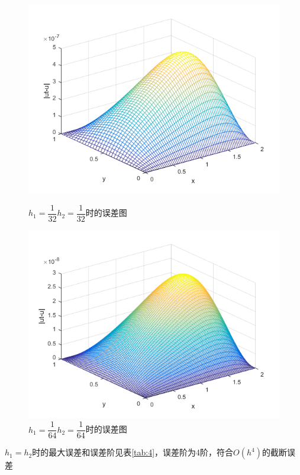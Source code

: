\documentclass[withoutpreface,bwprint]{cumcmthesis} %
\begin{document}
\begin{figure}[htbp]
	\begin{minipage}[htbp]{0.5\linewidth}
		\centering
		\includegraphics[width=1\linewidth]{figures/f11}
		\caption{$h_1=\dfrac{1}{32}$\quad$h_2=\dfrac{1}{32}$时的误差图}
		\label{fig:f11}
	\end{minipage}
	\begin{minipage}[htbp]{0.5\linewidth}
		\centering
		\includegraphics[width=1\linewidth]{figures/f12}
		\caption{$h_1=\dfrac{1}{64}$\quad$h_2=\dfrac{1}{64}$时的误差图}
		\label{fig:f12}
	\end{minipage}
\end{figure}

$h_1=h_2$时的最大误差和误差阶见表\ref{tab:4}，误差阶为4阶，符合$O(h^4)$的截断误差
\end{document}
